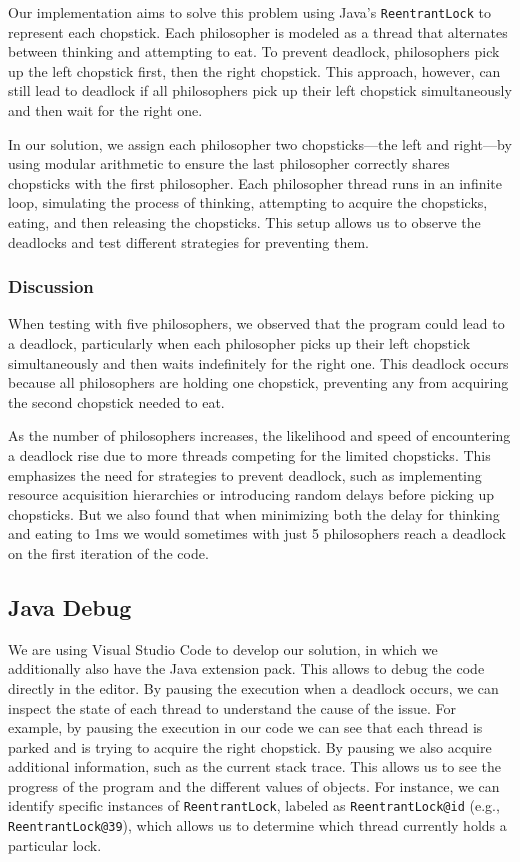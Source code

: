 \documentclass{article}
\begin{document}
Our implementation aims to solve this problem using Java’s \texttt{ReentrantLock} to represent each chopstick. Each philosopher is modeled as a thread that alternates between thinking and attempting to eat. To prevent deadlock, philosophers pick up the left chopstick first, then the right chopstick. This approach, however, can still lead to deadlock if all philosophers pick up their left chopstick simultaneously and then wait for the right one.

In our solution, we assign each philosopher two chopsticks—the left and right—by using modular arithmetic to ensure the last philosopher correctly shares chopsticks with the first philosopher. Each philosopher thread runs in an infinite loop, simulating the process of thinking, attempting to acquire the chopsticks, eating, and then releasing the chopsticks. This setup allows us to observe the deadlocks and test different strategies for preventing them.

\subsubsection{Discussion}
When testing with five philosophers, we observed that the program could lead to a deadlock, particularly when each philosopher picks up their left chopstick simultaneously and then waits indefinitely for the right one. This deadlock occurs because all philosophers are holding one chopstick, preventing any from acquiring the second chopstick needed to eat.

As the number of philosophers increases, the likelihood and speed of encountering a deadlock rise due to more threads competing for the limited chopsticks. This emphasizes the need for strategies to prevent deadlock, such as implementing resource acquisition hierarchies or introducing random delays before picking up chopsticks. But we also found that when minimizing both the delay for thinking and eating to 1ms we would sometimes with just 5 philosophers reach a deadlock on the first iteration of the code.

\subsection{Java Debug}

We are using Visual Studio Code to develop our solution, in which we additionally also have the Java extension pack. This allows to debug the code directly in the editor. By pausing the execution when a deadlock occurs, we can inspect the state of each thread to understand the cause of the issue.  For example, by pausing the execution in our code we can see that each thread is parked and is trying to acquire the right chopstick. By pausing we also acquire additional information, such as the current stack trace. This allows us to see the progress of the program and the different values of objects.  For instance, we can identify specific instances of \texttt{ReentrantLock}, labeled as \texttt{ReentrantLock@{id}} (e.g., \texttt{ReentrantLock@39}), which allows us to determine which thread currently holds a particular lock.
\end{document}
